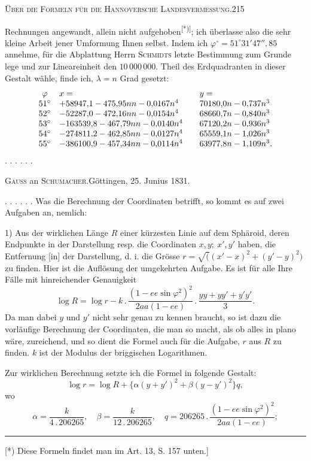 \par\clearpage
\noindent\mbox{}\hfill{\small\textsc{Über die Formeln für die Hannoversche Landesvermessung.}}\hfill215\par\medskip
\noindent Rechnungen angewandt, allein nicht aufgehoben\textsuperscript{[*)]}; ich überlasse also die sehr kleine Arbeit jener Umformung Ihnen selbst. Indem ich \(\varphi^\circ=51^\circ31'47''{,}85\) annehme, für die Abplattung Herrn \textsc{Schmidts} letzte Bestimmung zum Grunde lege und zur Lineareinheit den \(10\,000\,000.\) Theil des Erdquadranten in dieser Gestalt wähle, finde ich, \(\lambda=n\) Grad gesetzt:
\[
\begin{array}{c@{\quad}l@{\qquad}l}
\varphi&x=&y=\\
51^\circ&+58947{,}1-475{,}95nn-0{,}0167n^4&70180{,}0n-0{,}737n^3\\
52^\circ&-52287{,}0-472{,}16nn-0{,}0154n^4&68660{,}7n-0{,}840n^3\\
53^\circ&-163539{,}8-467{,}79nn-0{,}0140n^4&67120{,}2n-0{,}936n^3\\
54^\circ&-274811{,}2-462{,}85nn-0{,}0127n^4&65559{,}1n-1{,}026n^3\\
55^\circ&-386100{,}9-457{,}34nn-0{,}0114n^4&63977{,}8n-1{,}109n^3.
\end{array}
\]
. . . . . .
\bigskip
\begin{center}\textsc{Gauss} an \textsc{Schumacher}.\quad Göttingen, 25. Junius 1831.\end{center}
. . . . . . Was die Berechnung der Coordinaten betrifft, so kommt es auf zwei Aufgaben an, nemlich:

1) Aus der wirklichen Länge \(R\) einer kürzesten Linie auf dem Sphäroid, deren Endpunkte in der Darstellung resp. die Coordinaten \(x,y;\ x',y'\) haben, die Entfernung [in] der Darstellung, d. i. die Grösse \(r=\surd((x'-x)^2+(y'-y)^2)\) zu finden. Hier ist die Auflösung der umgekehrten Aufgabe. Es ist für alle Ihre Fälle mit hinreichender Genauigkeit
\[
\log R=\log r-k\,.\,\frac{(1-ee\sin\varphi^2)^2}{2aa(1-ee)}\,.\,\frac{yy+yy'+y'y'}3.
\]
Da man dabei \(y\) und \(y'\) nicht sehr genau zu kennen braucht, so ist dazu die vorläufige Berechnung der Coordinaten, die man so macht, als ob alles in plano wäre, zureichend, und so dient die Formel auch für die Aufgabe, \(r\) aus \(R\) zu finden. \(k\) ist der Modulus der briggischen Logarithmen.

Zur wirklichen Berechnung setzte ich die Formel in folgende Gestalt:
\[
\log r=\log R+\{\alpha(y+y')^2+\beta(y-y')^2\}q,
\]
\noindent wo
\[
\alpha=\frac{k}{4\,.\,206265},\quad\beta=\frac{k}{12\,.\,206265},\quad q=206265\,.\,\frac{(1-ee\sin\varphi^2)^2}{2aa(1-ee)};
\]
\par\noindent\rule{4cm}{.4pt}\par
{\footnotesize\noindent\hspace*{\parindent}[*) Diese Formeln findet man im Art. 13, S. 157 unten.]\par}

